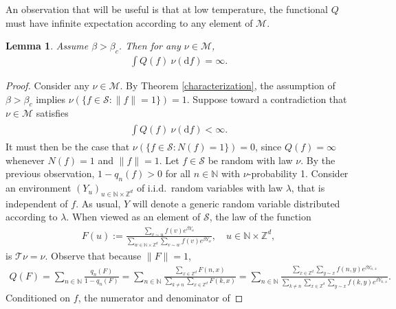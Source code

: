 \documentclass[11pt,reqno]{amsart}
\numberwithin{equation}{section}
\newtheorem{lemma}[thm]{Lemma}
\theoremstyle{definition}
\begin{document}
An observation that will be useful is that at low temperature, the functional $Q$ must have infinite expectation according to any element of ${\mathcal{M}}$.

\begin{lemma} \label{Q_lemma}
Assume $\beta > \beta_c$.
Then for any $\nu \in {\mathcal{M}}$,
{\begin{align*} {
\int Q(f)\ \nu({\mathrm{d}} f) = \infty.
} \end{align*}}
\end{lemma}

\begin{proof}
Consider any $\nu \in {\mathcal{M}}$.
By Theorem \ref{characterization}, the assumption of $\beta > \beta_c$ implies 
$\nu(\{f \in {\mathcal{S}}: \|f\| = 1\}) = 1$.
Suppose toward a contradiction that $\nu \in {\mathcal{M}}$ satisfies
{\begin{align} \begin{split} {
\int Q(f)\ \nu({\mathrm{d}} f) < \infty. \label{finite_Q_integral}
} \end{split} \end{align}}
It must then be the case that $\nu(\{f \in {\mathcal{S}}: N(f) = 1\}) = 0$, since $Q(f) = \infty$ whenever $N(f) = 1$ and $\|f\| = 1$.
Let $f \in {\mathcal{S}}$ be random with law $\nu$.
By the previous observation, $1-q_n(f) > 0$ for all $n \in {\mathbb{N}}$ with $\nu$-probability 1.
Consider an environment $(Y_u)_{u \in {\mathbb{N}} \times {\mathbb{Z}}^d}$ of i.i.d.~random variables with law $\lambda$, that is independent of $f$.
As usual, $Y$ will denote a generic random variable distributed according to $\lambda$.
When viewed as an element of ${\mathcal{S}}$, the law of the function
{\begin{align*} {
F(u) := \frac{\sum_{v \sim u} f(v)e^{\beta Y_u}}{\sum_{w \in {\mathbb{N}} \times {\mathbb{Z}}^d} \sum_{v \sim w} f(v)e^{\beta Y_w}}, \quad u \in {\mathbb{N}} \times {\mathbb{Z}}^d,
} \end{align*}}
is ${\mathcal{T}}\nu = \nu$.
Observe that because $\|F\| = 1$,
{\begin{align*} {
Q(F) = \sum_{n \in {\mathbb{N}}} \frac{q_n(F)}{1-q_n(F)}
= \sum_{n \in {\mathbb{N}}} \frac{\sum_{x \in {\mathbb{Z}}^d} F(n,x)}{\sum_{k \neq n} \sum_{x \in {\mathbb{Z}}^d} F(k,x)}
= \sum_{n \in {\mathbb{N}}} \frac{\sum_{x \in {\mathbb{Z}}^d} \sum_{y \sim x} f(n,y)e^{\beta Y_{n,\, x}}}{\sum_{k \neq n} \sum_{x \in {\mathbb{Z}}^d} \sum_{y \sim x} f(k,y)e^{\beta Y_{k,\, x}}}.
} \end{align*}}
Conditioned on $f$, the numerator and denominator of

\end{proof}
\end{document}
